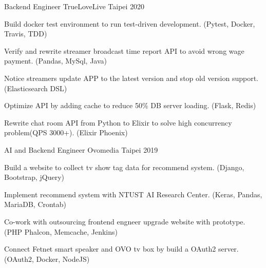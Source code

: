 

\begin{cventries}

  \cventry
    {Backend Engineer} %
    {TrueLoveLive} %
    {Taipei} %
    {2020} %
    {
      \begin{cvitems} %
        \item {Build docker test environment to run test-driven development. (Pytest, Docker, Travis, TDD)}
        \item {Verify and rewrite streamer broadcast time report API to avoid wrong wage payment. (Pandas, MySql, Java)}
        \item {Notice streamers update APP to the latest version and stop old version support. (Elasticsearch DSL)}
        \item {Optimize API by adding cache to reduce 50\% DB server loading. (Flask, Redis)}
        \item {Rewrite chat room API from Python to Elixir to solve high concurrency problem(QPS 3000+). (Elixir Phoenix)}
      \end{cvitems}
    }

  \cventry
    {AI and Backend Engineer} %
    {Ovomedia} %
    {Taipei} %
    {2019} %
    {
      \begin{cvitems} %
        \item {Build a website to collect tv show tag data for recommend system. (Django, Bootstrap, jQuery)}
        \item {Implement recommend system with NTUST AI Research Center. (Keras, Pandas, MariaDB, Crontab)}
        \item {Co-work with outsourcing frontend engneer upgrade website with prototype. (PHP Phalcon, Memcache, Jenkins)}
        \item {Connect Fetnet smart speaker and OVO tv box by build a OAuth2 server. (OAuth2, Docker, NodeJS)}
      \end{cvitems}
    }

\end{cventries}
